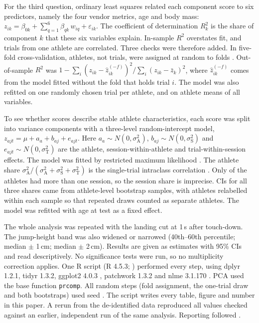 For the third question, ordinary least squares related each component score to six predictors, namely the four vendor metrics, age and body mass: $z_{ik} = \beta_{0k} + \sum_{q=1}^{6}\beta_{qk}\,w_{iq} + \varepsilon_{ik}$. The coefficient of determination $R^2_k$ is the share of component $k$ that these six variables explain. In-sample $R^2$ overstates fit, and trials from one athlete are correlated. Three checks were therefore added. In five-fold cross-validation, athletes, not trials, were assigned at random to folds \parencite{roberts2017}. Out-of-sample $R^2$ was $1 - \sum_i (z_{ik} - \hat z^{(-f)}_{ik})^2 / \sum_i (z_{ik} - \bar z_k)^2$, where $\hat z^{(-f)}_{ik}$ comes from the model fitted without the fold that holds trial $i$. The model was also refitted on one randomly chosen trial per athlete, and on athlete means of all variables.

To see whether scores describe stable athlete characteristics, each score was split into variance components with a three-level random-intercept model, $z_{ajt} = \mu + a_a + b_{aj} + e_{ajt}$. Here $a_a \sim N(0, \sigma^2_{\mathrm{A}})$, $b_{aj} \sim N(0, \sigma^2_{\mathrm{S}})$ and $e_{ajt} \sim N(0, \sigma^2_{\mathrm{T}})$ are the athlete, session-within-athlete and trial-within-session effects. The model was fitted by restricted maximum likelihood \parencite{pinheiro2000}. The athlete share $\sigma^2_{\mathrm{A}} / (\sigma^2_{\mathrm{A}} + \sigma^2_{\mathrm{S}} + \sigma^2_{\mathrm{T}})$ is the single-trial intraclass correlation \parencite{hopkins2000,koo2016}. Only \nAthMultiSess{} of the \nAth{} athletes had more than one session, so the session share is imprecise. CIs for all three shares came from \nBoot{} athlete-level bootstrap samples, with athletes relabelled within each sample so that repeated draws counted as separate athletes. The model was refitted with age at test as a fixed effect.

The whole analysis was repeated with the landing cut at 1\,s after touch-down. The jump-height band was also widened or narrowed (40th--60th percentile; median $\pm$ 1\,cm; median $\pm$ 2\,cm). Results are given as estimates with 95\% CIs and read descriptively. No significance tests were run, so no multiplicity correction applies. One R script (R 4.5.3; \cite{rcore2026}) performed every step, using dplyr 1.2.1, tidyr 1.3.2, ggplot2 4.0.3 \parencite{wickham2016}, patchwork 1.3.2 and nlme 3.1.170 \parencite{pinheiro2000}. PCA used the base function \texttt{prcomp}. All random steps (fold assignment, the one-trial draw and both bootstraps) used seed \seedValue. The script writes every table, figure and number in this paper. A rerun from the de-identified data reproduced all \nReproTotal{} values checked against an earlier, independent run of the same analysis. Reporting followed \textcite{hopkins2009}.

